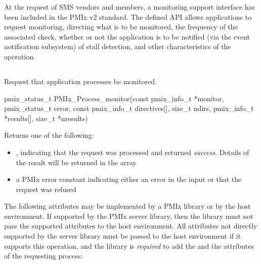 At the request of \ac{SMS} vendors and members, a monitoring support interface has been included in the PMIx v2 standard. The defined \ac{API} allows applications to request monitoring, directing what is to be monitored, the frequency of the associated check, whether or not the application is to be notified (via the event notification subsystem) of stall detection, and other characteristics of the operation.

\subsection{}

\summary

Request that application processes be monitored.

\format

\cspecificstart
\begin{codepar}
pmix_status_t
PMIx_Process_monitor(const pmix_info_t *monitor, pmix_status_t error,
                     const pmix_info_t directives[], size_t ndirs,
                     pmix_info_t *results[], size_t *nresults)
\end{codepar}
\cspecificend

\begin{arglist}
\end{arglist}

Returns one of the following:

\begin{itemize}
    \item {}, indicating that the request was processed and returned \textit{success}. Details of the result will be returned in the  array
    \item a PMIx error constant indicating either an error in the input or that the request was refused
\end{itemize}

\optattrstart
The following attributes may be implemented by a \ac{PMIx} library or by the host environment. If supported by the \ac{PMIx} server library, then the library must not pass the supported attributes to the host environment. All attributes not directly supported by the server library must be passed to the host environment if it supports this operation, and the library is \textit{required} to add the  and the  attributes of the requesting process:


